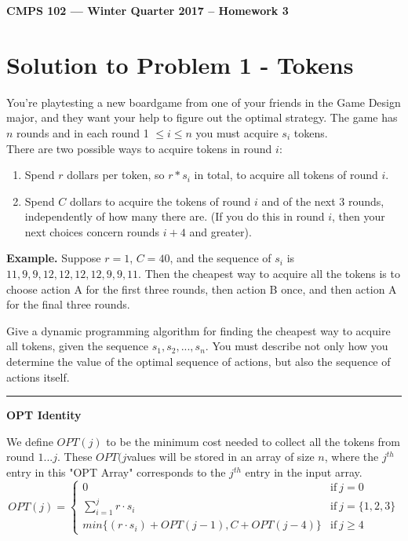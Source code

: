 \documentclass[11pt]{article}
\begin{document}
\begin{center}
{\bf\Large CMPS 102 --- Winter Quarter 2017 --  Homework 3}
\end{center}

\section*{Solution to Problem 1 - Tokens}

You're playtesting a new boardgame from one of your friends in the Game Design major, and they want your help to figure out the optimal strategy. The game has $n$ rounds and in each round 1 $\leq i \leq n$ you must acquire $s_i$ tokens.\\
There are two possible ways to acquire tokens in round $i$:

\begin{enumerate}[label=(\Alph*)]
\item Spend $r$ dollars per token, so $r * s_i$ in total, to acquire all tokens of round $i$.
\item Spend $C$ dollars to acquire the tokens of round $i$ and of the next 3 rounds, independently of how many there are. (If you do this in round $i$, then your next choices concern rounds $i + 4$ and greater).
\end{enumerate}

\textbf{Example.} Suppose $r = 1$, $C = 40$, and the sequence of $s_i$ is $11, 9, 9, 12, 12, 12, 12, 9, 9, 11$. Then the cheapest way to acquire all the tokens is to choose action A for the first three rounds, then action B once, and then action A for the final three rounds.


Give a dynamic programming algorithm for finding the cheapest way to acquire all tokens, given the sequence $s_1, s_2, ..., s_n$. You must describe not only how you determine the value of the optimal sequence of actions, but also the sequence of actions itself.

\noindent\rule{17cm}{0.4pt}

\textbf{OPT Identity}

We define $OPT(j)$ to be the minimum cost needed to collect all the tokens from round $1...j$. 
These $OPT(j $values will be stored in an array of size $n$, where the $j^{th}$ entry in this "OPT Array" corresponds to the $j^{th}$ entry in the input array.
\begin{equation}
	OPT(j) = 
	\begin{cases}
	0 & \text{if} \ j = 0\\
	\sum_{i=1}^{j} r \cdot s_i & \text{if} \ j = \{1, 2, 3\}\\
	min\{(r \cdot s_i) + OPT(j - 1), C + OPT(j-4)\} & \text{if} \ j \geq 4
	\end{cases}
\end{equation}
\end{document}
